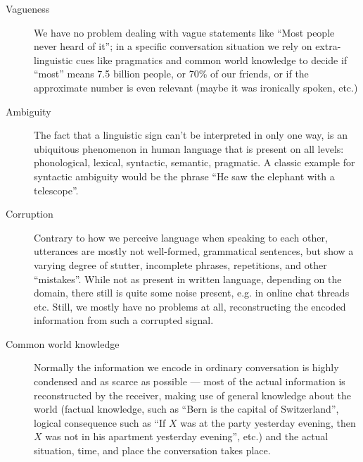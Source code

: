 \begin{description}
  \item[Vagueness] We have no problem dealing with vague statements like ``Most people never heard of it''; in a specific conversation situation we rely on extra-linguistic cues like pragmatics and common world knowledge to decide if ``most'' means 7.5 billion people, or 70\% of our friends, or if the approximate number is even relevant (maybe it was ironically spoken, etc.)
  \item[Ambiguity] The fact that a linguistic sign can't be interpreted in only one way, is an ubiquitous phenomenon in human language that is present on all levels: phonological, lexical, syntactic, semantic, pragmatic. A classic example for syntactic ambiguity would be the phrase ``He saw the elephant with a telescope''.
  \item[Corruption] Contrary to how we perceive language when speaking to each other, utterances are mostly not well-formed, grammatical sentences, but show a varying degree of stutter, incomplete phrases, repetitions, and other ``mistakes''. While not as present in written language, depending on the domain, there still is quite some noise present, e.g. in online chat threads etc. Still, we mostly have no problems at all, reconstructing the encoded information from such a corrupted signal.
  \item[Common world knowledge] Normally the information we encode in ordinary conversation is highly condensed and as scarce as possible --- most of the actual information is reconstructed by the receiver, making use of general knowledge about the world (factual knowledge, such as ``Bern is the capital of Switzerland'', logical consequence such as ``If $X$ was at the party yesterday evening, then $X$ was not in his apartment yesterday evening'', etc.) and the actual situation, time, and place the conversation takes place.
\end{description}


